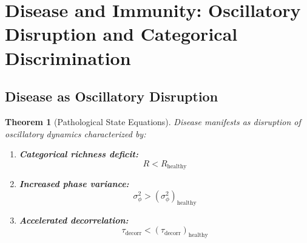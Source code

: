 \documentclass[12pt,a4paper]{article}
\newtheorem{theorem}{Theorem}
\begin{document}
\section{Disease and Immunity: Oscillatory Disruption and Categorical Discrimination}

\subsection{Disease as Oscillatory Disruption}

\begin{theorem}[Pathological State Equations]
Disease manifests as disruption of oscillatory dynamics characterized by:
\begin{enumerate}
\item \textbf{Categorical richness deficit:} $$R < R_{\text{healthy}}$$
\item \textbf{Increased phase variance:} $$\sigma_\phi^2 > (\sigma_\phi^2)_{\text{healthy}}$$
\item \textbf{Accelerated decorrelation:} $$\tau_{\text{decorr}} < (\tau_{\text{decorr}})_{\text{healthy}}$$
\end{enumerate}
\end{theorem}
\end{document}

